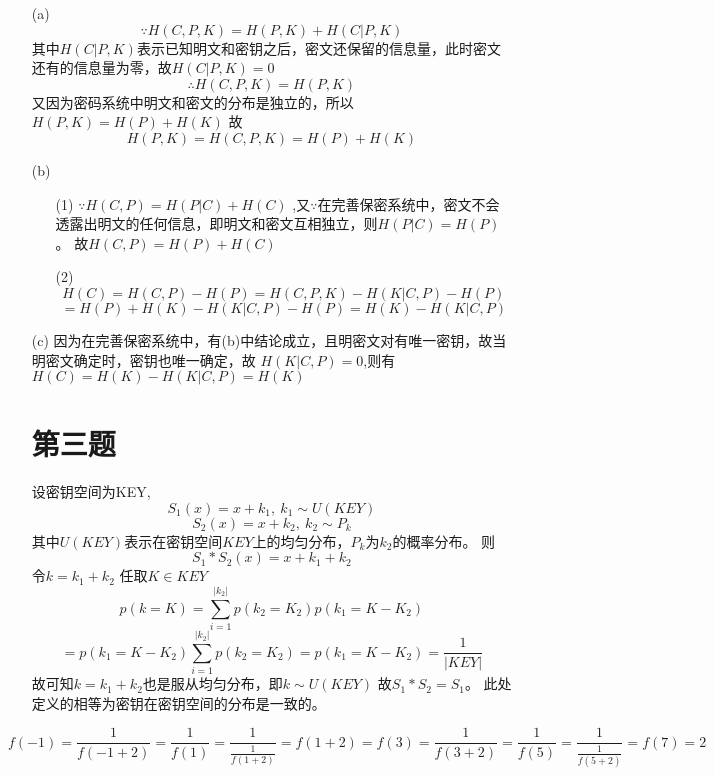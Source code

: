 \documentclass{article}
\begin{document}
\begin{itemize}
    \item [(a)]
    \[\because H(C,P,K) = H(P,K) + H(C | P,K)\]
    其中$H(C|P,K)$表示已知明文和密钥之后，密文还保留的信息量，此时密文还有的信息量为零，故$H(C|P,K)=0$
    \[\therefore H(C,P,K) = H(P,K)\]
    又因为密码系统中明文和密文的分布是独立的，所以$H(P,K)=H(P)+H(K)$
    故\[H(P,K)=H(C,P,K)=H(P)+H(K)\]
    \item [(b)]
    \begin{itemize}
        \item [(1)] 
            $\because H(C,P)=H(P|C) + H(C)$
            ,又$\because$在完善保密系统中，密文不会透露出明文的任何信息，即明文和密文互相独立，则$H(P|C)=H(P)$。
            故$H(C,P)=H(P) + H(C)$
        \item [(2)]
             \[H(C)=H(C,P)-H(P)=H(C,P,K)-H(K|C,P)-H(P) \]
            \[ =H(P)+H(K)-H(K|C,P)-H(P)=H(K)-H(K|C,P)\]
               
    \end{itemize}

    \item [(c)]
    因为在完善保密系统中，有(b)中结论成立，且明密文对有唯一密钥，故当明密文确定时，密钥也唯一确定，故
    $H(K|C,P) = 0$,则有$H(C)=H(K)-H(K|C,P)=H(K)$

\section*{第三题}
    设密钥空间为KEY,\[S_1(x)=x+k_1,\ k_1\sim U(KEY)\]
    \[S_2(x)=x+k_2,\ k_2 \sim P_k\]
    其中$U(KEY)$表示在密钥空间$KEY$上的均匀分布，$P_k$为$k_2$的概率分布。
    则\[S_1*S_2(x)=x+k_1+k_2\]
    令$k=k_1+k_2$
    任取$K\in KEY$
    \[p(k=K)=\sum_{i=1}^{|k_2|} p(k_2=K_2)p(k_1=K-K_2) \]
    \[= p(k_1=K-K_2)\sum_{i=1}^{|k_2|} p(k_2=K_2)=p(k_1=K-K_2)=\frac{1}{|KEY|}\]
    故可知$k=k_1+k_2$也是服从均匀分布，即$k \sim U(KEY)$
    故$S_1*S_2=S_1$。
    此处定义的相等为密钥在密钥空间的分布是一致的。
\end{itemize}

\[f(-1)=\frac{1}{f(-1+2)}=\frac{1}{f(1)}=\frac{1}{\frac{1}{f(1+2)}}=f(1+2)=f(3)=\frac{1}{f(3+2)}=\frac{1}{f(5)}=\frac{1}{\frac{1}{f(5+2)}}=f(7)=2\]
\end{document}
